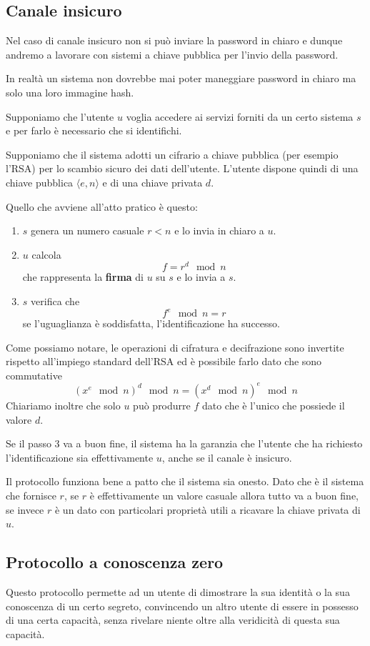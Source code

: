 \subsection{Canale insicuro}
Nel caso di canale insicuro non si pu\`o inviare la password in chiaro e dunque andremo a lavorare con sistemi a
chiave pubblica per l'invio della password.

In realt\`a un sistema non dovrebbe mai poter maneggiare password in chiaro ma solo una loro immagine hash.

Supponiamo che l'utente $u$ voglia accedere ai servizi forniti da un certo sistema $s$ e per farlo \`e necessario
che si identifichi.

Supponiamo che il sistema adotti un cifrario a chiave pubblica (per esempio l'RSA) per lo scambio sicuro dei dati
dell'utente. L'utente dispone quindi di una chiave pubblica $\langle e, n \rangle$ e di una chiave privata $d$.

Quello che avviene all'atto pratico \`e questo:
\begin{enumerate}
	\item $s$ genera un numero casuale $r < n$ e lo invia in chiaro a $u$.
	\item $u$ calcola
	      \[ f = r^d \mod{n} \]
	      che rappresenta la \textbf{firma} di $u$ su $s$ e lo invia a $s$.
	\item $s$ verifica che
	      \[ f^e \mod{n} = r \]
	      se l'uguaglianza \`e soddisfatta, l'identificazione ha successo.
\end{enumerate}
Come possiamo notare, le operazioni di cifratura e decifrazione sono invertite rispetto all'impiego standard dell'RSA
ed \`e possibile farlo dato che sono commutative
\[ (x^e \mod{n})^d \mod{n} = (x^d \mod{n})^e \mod{n} \]
Chiariamo inoltre che solo $u$ pu\`o produrre $f$ dato che \`e l'unico che possiede il valore $d$.

Se il passo 3 va a buon fine, il sistema ha la garanzia che l'utente che ha richiesto l'identificazione sia
effettivamente $u$, anche se il canale \`e insicuro.

Il protocollo funziona bene a patto che il sistema sia onesto. Dato che \`e il sistema che fornisce $r$, se $r$ \`e
effettivamente un valore casuale allora tutto va a buon fine, se invece $r$ \`e un dato con particolari propriet\`a
utili a ricavare la chiave privata di $u$.

\subsection{Protocollo a conoscenza zero}
Questo protocollo permette ad un utente di dimostrare la sua identit\`a o la sua conoscenza di un certo segreto,
convincendo un altro utente di essere in possesso di una certa capacit\`a, senza rivelare niente oltre alla
veridicit\`a di questa sua capacit\`a.

